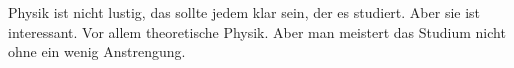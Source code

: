 \documentclass{scrartcl}
\begin{document}
	
Physik ist nicht lustig, das sollte jedem klar sein, der es studiert. Aber sie ist interessant. \cite[S. 2]{Demtr} Vor allem theoretische Physik. \cite{Nolt}
Aber man meistert das Studium nicht ohne ein wenig Anstrengung. \cite{Bart}
\printbibliography
\end{document}
